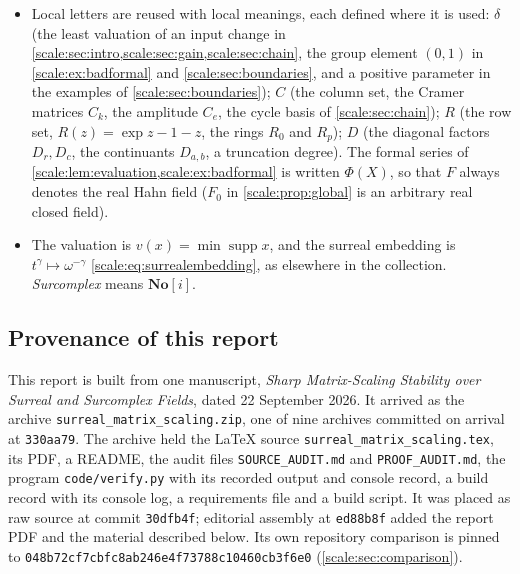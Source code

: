 \documentclass[11pt,a4paper]{article}
\numberwithin{equation}{section}
\theoremstyle{definition}
\newcommand{\No}{\mathbf{No}}
\newcommand{\supp}{\operatorname{supp}}
\newcommand{\pin}{048b72cf7cbfc8ab246e4f73788c10460cb3f6e0}
\begin{document}
\begin{itemize}
idempotents. $L_p=BW_pB^{\mathsf T}$ is a symmetric reduced weighted Laplacian,
not that report's row Laplacian. $H_p=I-\Pi_p$ is a projection, not a
Hermitian matrix $H$ as in the spectral report, and $\Pi_p$ is unrelated to
the exponent matrix $\Pi$ of the theta-series material in the Hahn--Tate
report. $s$ is a perturbation scalar, not a resolvent parameter.
\item Local letters are reused with local meanings, each defined where it is
used: $\delta$ (the least valuation of an input change in
\cref{scale:sec:intro,scale:sec:gain,scale:sec:chain}, the group element
$(0,1)$ in \cref{scale:ex:badformal} and \cref{scale:sec:boundaries}, and a
positive parameter in the examples of \cref{scale:sec:boundaries});
$C$ (the column set, the Cramer matrices $C_k$, the amplitude $C_e$, the
cycle basis of \cref{scale:sec:chain}); $R$ (the row set, $R(z)=\exp z-1-z$,
the rings $R_0$ and $R_p$); $D$ (the diagonal factors $D_r,D_c$, the
continuants $D_{a,b}$, a truncation degree). The formal series of
\cref{scale:lem:evaluation,scale:ex:badformal} is written $\Phi(X)$, so that
$F$ always denotes the real Hahn field ($F_0$ in \cref{scale:prop:global} is
an arbitrary real closed field).
\item The valuation is $v(x)=\min\supp x$, and the surreal embedding is
$t^\gamma\mapsto\omega^{-\gamma}$ \eqref{scale:eq:surrealembedding}, as
elsewhere in the collection. \emph{Surcomplex} means $\No[i]$.
\end{itemize}

\subsection{Provenance of this report}\label{scale:sec:provenance}
This report is built from one manuscript, \emph{Sharp Matrix-Scaling
Stability over Surreal and Surcomplex Fields}, dated 22 September 2026. It
arrived as the archive \nolinkurl{surreal_matrix_scaling.zip}, one of nine
archives committed on arrival at \texttt{330aa79}. The archive held the LaTeX
source \texttt{surreal\_matrix\_scaling.tex}, its PDF, a README, the audit
files \texttt{SOURCE\_AUDIT.md} and \texttt{PROOF\_AUDIT.md}, the program
\texttt{code/verify.py} with its recorded output and console record, a build
record with its console log, a requirements file and a build script. It was
placed as raw source at commit \texttt{30dfb4f}; editorial assembly at
\texttt{ed88b8f} added the report PDF and the material described below. Its
own repository comparison is pinned to \texttt{\pin}
(\cref{scale:sec:comparison}).
\end{document}
